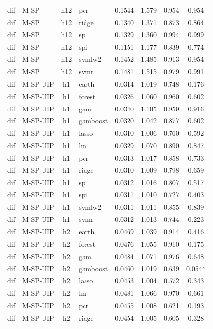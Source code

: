 \begin{ThreePartTable}
\begin{longtable}[t]{llclcccc}
dif & M-SP & h12 & pcr & 0.1544 & 1.579 & 0.954 & 0.954\\
dif & M-SP & h12 & ridge & 0.1340 & 1.371 & 0.873 & 0.864\\
dif & M-SP & h12 & sp & 0.1329 & 1.360 & 0.994 & 0.999\\
dif & M-SP & h12 & spi & 0.1151 & 1.177 & 0.839 & 0.774\\
dif & M-SP & h12 & svmlw2 & 0.1452 & 1.485 & 0.913 & 0.954\\
dif & M-SP & h12 & svmr & 0.1481 & 1.515 & 0.979 & 0.991\\
\addlinespace
dif & M-SP-UIP & h1 & earth & 0.0314 & 1.019 & 0.748 & 0.176\\
dif & M-SP-UIP & h1 & forest & 0.0326 & 1.060 & 0.960 & 0.602\\
dif & M-SP-UIP & h1 & gam & 0.0340 & 1.105 & 0.959 & 0.916\\
dif & M-SP-UIP & h1 & gamboost & 0.0320 & 1.042 & 0.877 & 0.602\\
dif & M-SP-UIP & h1 & lasso & 0.0310 & 1.006 & 0.760 & 0.592\\
dif & M-SP-UIP & h1 & lm & 0.0329 & 1.070 & 0.890 & 0.847\\
dif & M-SP-UIP & h1 & pcr & 0.0313 & 1.017 & 0.858 & 0.733\\
dif & M-SP-UIP & h1 & ridge & 0.0310 & 1.009 & 0.798 & 0.659\\
dif & M-SP-UIP & h1 & sp & 0.0312 & 1.016 & 0.807 & 0.517\\
dif & M-SP-UIP & h1 & spi & 0.0311 & 1.010 & 0.727 & 0.403\\
dif & M-SP-UIP & h1 & svmlw2 & 0.0311 & 1.011 & 0.855 & 0.839\\
dif & M-SP-UIP & h1 & svmr & 0.0312 & 1.013 & 0.744 & 0.223\\
\addlinespace
dif & M-SP-UIP & h2 & earth & 0.0469 & 1.039 & 0.914 & 0.416\\
dif & M-SP-UIP & h2 & forest & 0.0476 & 1.055 & 0.910 & 0.175\\
dif & M-SP-UIP & h2 & gam & 0.0484 & 1.071 & 0.976 & 0.648\\
dif & M-SP-UIP & h2 & gamboost & 0.0460 & 1.019 & 0.639 & 0.054*\\
dif & M-SP-UIP & h2 & lasso & 0.0453 & 1.004 & 0.572 & 0.343\\
dif & M-SP-UIP & h2 & lm & 0.0481 & 1.066 & 0.970 & 0.661\\
dif & M-SP-UIP & h2 & pcr & 0.0455 & 1.008 & 0.621 & 0.193\\
dif & M-SP-UIP & h2 & ridge & 0.0454 & 1.005 & 0.605 & 0.328\\

\end{longtable}
\end{ThreePartTable}
